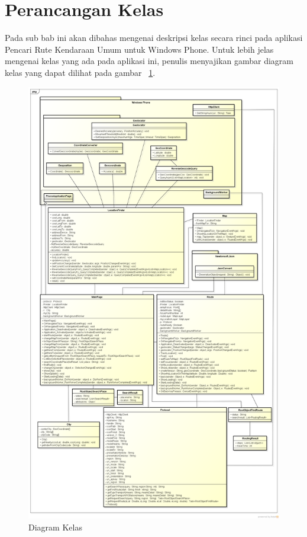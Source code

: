 \section{Perancangan Kelas}
\label{lab:Perancangan Kelas}
\hspace{0.5cm} Pada sub bab ini akan dibahas mengenai deskripsi kelas secara rinci pada aplikasi Pencari Rute Kendaraan Umum untuk Windows Phone. Untuk lebih jelas mengenai kelas yang ada pada aplikasi ini, penulis menyajikan gambar diagram kelas yang dapat dilihat pada  gambar ~\ref{fig:kelas}. 

\begin{figure}[h]
	\centering
		\includegraphics[scale=0.2]{Gambar/useCase_dan_Class/class4}
	\caption{Diagram Kelas}
	\label{fig:kelas}
\end{figure}


